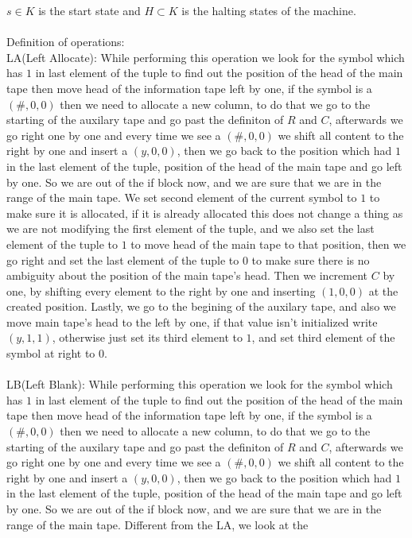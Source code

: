 \documentclass[12pt]{article}
\begin{document}
$s\in K$ is the start state and $H\subset K$ is the halting states of the machine.\\
\\
Definition of operations:\\
LA(Left Allocate): While performing this operation we look for the symbol which has $1$ in
last element of the tuple to find out the position of the head of the main tape then move head 
of the information tape left by one, if the symbol is a $(\#,0,0)$
then we need to allocate a new column, to do that we go to the starting of the auxilary tape
and go past the definiton of $R$ and $C$, afterwards we go right one by one and
every time we see a $(\#,0,0)$ we shift all content to the right by one and insert a
$(y,0,0)$, then we go back to the position which had $1$ in the last element of the tuple,
position of the head of the main tape and go left by one. So we are out of the if block now,
and we are sure that we are in the range of the main tape. We set second element of the current
symbol to $1$ to make sure it is allocated, if it is already allocated this does not change a thing
as we are not modifying the first element of the tuple, and we also set the last element of the
tuple to $1$ to move head of the main tape to that position, then we go right and set the
last element of the tuple to $0$ to make sure there is no ambiguity about the position of the
main tape's head. Then we increment $C$ by one, by shifting every element to the right
by one and inserting $(1,0,0)$ at the created position. Lastly, we go to the begining of the auxilary tape, and also we move main tape's
head to the left by one, if that value isn't initialized write $(y,1,1)$, otherwise just set its third
element to $1$, and set third element of the symbol at right to $0$.\\
\\
LB(Left Blank): While performing this operation we look for the symbol which has $1$ in
last element of the tuple to find out the position of the head of the main tape then move head 
of the information tape left by one, if the symbol is a $(\#,0,0)$
then we need to allocate a new column, to do that we go to the starting of the auxilary tape
and go past the definiton of $R$ and $C$, afterwards we go right one by one and
every time we see a $(\#,0,0)$ we shift all content to the right by one and insert a
$(y,0,0)$, then we go back to the position which had $1$ in the last element of the tuple,
position of the head of the main tape and go left by one. So we are out of the if block now,
and we are sure that we are in the range of the main tape. Different from the LA, we look at the
\end{document}
